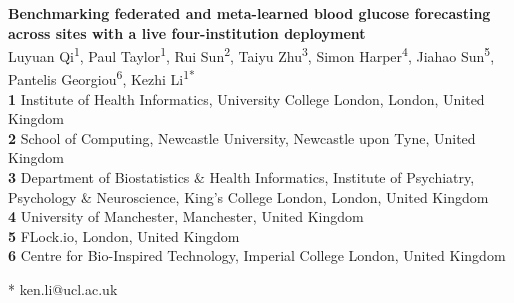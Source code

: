\documentclass[10pt,letterpaper]{article}
\begin{document}
\vspace*{0.2in}

\begin{flushleft}
{\Large
\textbf{Benchmarking federated and meta-learned blood glucose forecasting across sites with a live four-institution deployment}
}
\newline
\\
Luyuan Qi\textsuperscript{1},
Paul Taylor\textsuperscript{1},
Rui Sun\textsuperscript{2},
Taiyu Zhu\textsuperscript{3},
Simon Harper\textsuperscript{4},
Jiahao Sun\textsuperscript{5},
Pantelis Georgiou\textsuperscript{6},
Kezhi Li\textsuperscript{1*}
\\
\bigskip
\textbf{1} Institute of Health Informatics, University College London, London, United Kingdom
\\
\textbf{2} School of Computing, Newcastle University, Newcastle upon Tyne, United Kingdom
\\
\textbf{3} Department of Biostatistics \& Health Informatics, Institute of Psychiatry, Psychology \& Neuroscience, King's College London, London, United Kingdom
\\
\textbf{4} University of Manchester, Manchester, United Kingdom
\\
\textbf{5} FLock.io, London, United Kingdom
\\
\textbf{6} Centre for Bio-Inspired Technology, Imperial College London, United Kingdom
\\
\bigskip

* ken.li@ucl.ac.uk

\end{flushleft}

\end{document}
